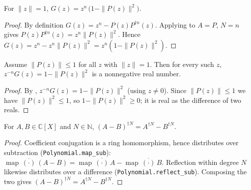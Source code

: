\begin{lemma}
    \label{lem:G-eval-circle}
    \leanok
    For $\|z\| = 1$, $G(z) = z^{n}\,\bigl(1 - \|P(z)\|^2\bigr)$.
\end{lemma}
\begin{proof}
    By definition $G(z) = z^{n} - P(z)P^{\dagger n}(z)$. Applying
     to $A = P$, $N = n$ gives
    $P(z)P^{\dagger n}(z) = z^{n}\|P(z)\|^2$. Hence
    $G(z) = z^{n} - z^{n}\|P(z)\|^2 = z^{n}(1 - \|P(z)\|^2)$.
\end{proof}

\begin{lemma}
    \label{lem:G-nonneg-circle}
    \leanok
    Assume $\|P(z)\| \le 1$ for all $z$ with $\|z\| = 1$. Then for every such
    $z$, $z^{-n}G(z) = 1 - \|P(z)\|^2$ is a nonnegative real number.
\end{lemma}
\begin{proof}
    By , $z^{-n}G(z) = 1 - \|P(z)\|^2$ (using
    $z \neq 0$). Since $\|P(z)\| \le 1$ we have $\|P(z)\|^2 \le 1$, so
    $1 - \|P(z)\|^2 \ge 0$; it is real as the difference of two reals.
\end{proof}

\begin{lemma}
    \label{lem:conjrecip-sub}
    \leanok
    For $A, B \in \mathbb{C}[X]$ and $N \in \mathbb{N}$,
    $(A - B)^{\dagger N} = A^{\dagger N} - B^{\dagger N}$.
\end{lemma}
\begin{proof}
    Coefficient conjugation is a ring homomorphism, hence distributes over
    subtraction (\texttt{Polynomial.map\_sub}):
    $\operatorname{map}\,\overline{(\cdot)}\,(A - B)
    = \operatorname{map}\,\overline{(\cdot)}\,A
    - \operatorname{map}\,\overline{(\cdot)}\,B$. Reflection within degree $N$
    likewise distributes over a difference (\texttt{Polynomial.reflect\_sub}).
    Composing the two gives $(A-B)^{\dagger N} = A^{\dagger N} - B^{\dagger N}$.
\end{proof}

